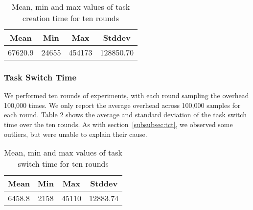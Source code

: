 \begin{table}[htb]

    \caption{Mean, min and max values of task creation time for ten rounds}
\begin{tabular}{|c|c|c|c|} 
    \hline
    Mean & Min & Max & Stddev\\ 
    \hline
    67620.9 & 24655 & 454173 & 128850.70\\ 
    \hline
   \end{tabular}
    \label{tab:t4}
\end{table}

\subsubsection{Task Switch Time}
We performed ten rounds of experiments, with each round sampling the
overhead 100,000 times. %
We only report the average overhead across 100,000 samples for each
round. %
Table \ref{tab:t5} shows the average and standard deviation of the
task switch time over the ten rounds. %
As with section~\ref{subsubsec:tct}, we observed some outliers, but
were unable to explain their cause.

\begin{table}[htb]

    \caption{Mean, min and max values of task switch time for ten rounds}
 
\begin{tabular}{|c|c|c|c|} 
    \hline
    Mean & Min & Max & Stddev\\ 
    \hline
    6458.8 & 2158 & 45110 & 12883.74\\ 
    \hline
   \end{tabular}
    \label{tab:t5}
\end{table}
